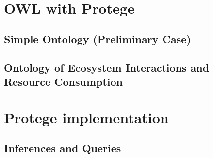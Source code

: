 \documentclass[12pt]{article}
\begin{document}
\tableofcontents

\newpage

\section{OWL with Protege}
\subsection{Simple Ontology (Preliminary Case)}


\subsection{Ontology of Ecosystem Interactions and Resource Consumption}


\section{Protege implementation}


\subsection{Inferences and Queries}

\end{document}
